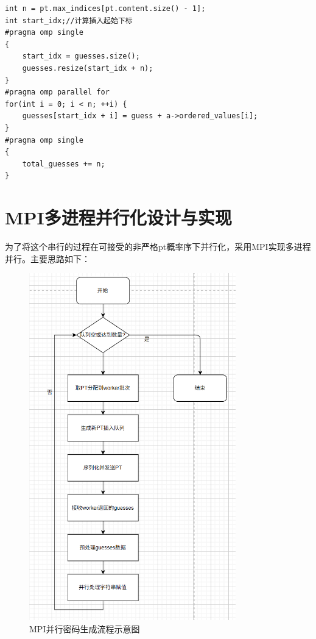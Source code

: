 \documentclass[a4paper]{article}
\begin{document}
\begin{lstlisting}[caption=OpenMP并行实现关键代码]
int n = pt.max_indices[pt.content.size() - 1];
int start_idx;//计算插入起始下标
#pragma omp single
{
    start_idx = guesses.size();
    guesses.resize(start_idx + n);
}
#pragma omp parallel for
for(int i = 0; i < n; ++i) {
    guesses[start_idx + i] = guess + a->ordered_values[i];
}
#pragma omp single
{
    total_guesses += n;
}
\end{lstlisting}
\section{MPI多进程并行化设计与实现}
为了将这个串行的过程在可接受的非严格pt概率序下并行化，采用MPI实现多进程并行。主要思路如下：
\begin{figure}[H] %
    \centering
    \includegraphics[width=0.8\textwidth]{image.png}
    \caption{MPI并行密码生成流程示意图}
    \label{fig:password_flow}
\end{figure}
\end{document}

